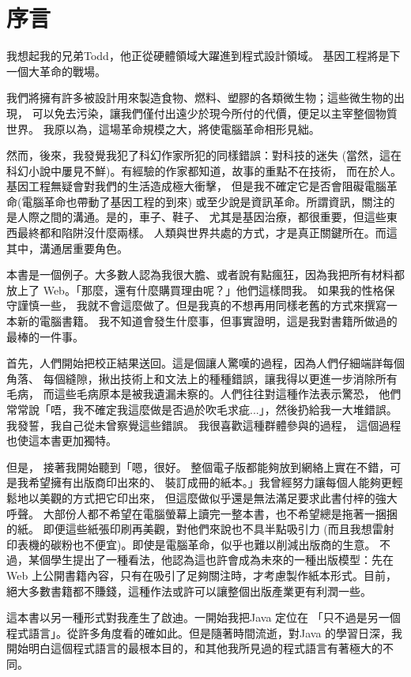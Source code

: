 \chapter[序言]{序言}
我想起我的兄弟Todd，他正從硬體領域大躍進到程式設計領域。
基因工程將是下一個大革命的戰場。

我們將擁有許多被設計用來製造食物、燃料、塑膠的各類微生物；這些微生物的出現，
可以免去污染，讓我們僅付出遠少於現今所付的代價，便足以主宰整個物質世界。
我原以為，這場革命規模之大，將使電腦革命相形見絀。

然而，後來，我發覺我犯了科幻作家所犯的同樣錯誤：對科技的迷失
(當然，這在科幻小說中屢見不鮮)。有經驗的作家都知道，故事的重點不在技術，
而在於人。基因工程無疑會對我們的生活造成極大衝擊，
但是我不確定它是否會阻礙電腦革命(電腦革命也帶動了基因工程的到來)
或至少說是資訊革命。所謂資訊，關注的是人際之間的溝通。是的，車子、鞋子、
尤其是基因治療，都很重要，但這些東西最終都和陷阱沒什麼兩樣。
人類與世界共處的方式，才是真正關鍵所在。而這其中，溝通居重要角色。

本書是一個例子。大多數人認為我很大膽、或者說有點瘋狂，因為我把所有材料都放上了
Web。「那麼，還有什麼購買理由呢？」他們這樣問我。 如果我的性格保守謹慎一些，
我就不會這麼做了。但是我真的不想再用同樣老舊的方式來撰寫一本新的電腦書籍。
我不知道會發生什麼事，但事實證明，這是我對書籍所做過的最棒的一件事。

首先，人們開始把校正結果送回。這是個讓人驚嘆的過程，因為人們仔細端詳每個角落、
每個縫隙，揪出技術上和文法上的種種錯誤，讓我得以更進一步消除所有毛病，
而這些毛病原本是被我遺漏未察的。人們往往對這種作法表示驚恐，
他們常常說「唔，我不確定我這麼做是否過於吹毛求疵...」，然後扔給我一大堆錯誤。
我發誓，我自己從未曾察覺這些錯誤。 我很喜歡這種群體參與的過程，
這個過程也使這本書更加獨特。

但是， 接著我開始聽到「嗯，很好。
整個電子版都能夠放到網絡上實在不錯，可是我希望擁有出版商印出來的、
裝訂成冊的紙本。」我曾經努力讓每個人能夠更輕鬆地以美觀的方式把它印出來，
但這麼做似乎還是無法滿足要求此書付梓的強大呼聲。
大部份人都不希望在電腦螢幕上讀完一整本書，也不希望總是拖著一捆捆的紙。
即便這些紙張印刷再美觀，對他們來說也不具半點吸引力
(而且我想雷射印表機的碳粉也不便宜)。即使是電腦革命，似乎也難以削減出版商的生意。
不過，某個學生提出了一種看法，他認為這也許會成為未來的一種出版模型：先在
Web 上公開書籍內容，只有在吸引了足夠關注時，才考慮製作紙本形式。目前，
絕大多數書籍都不賺錢，這種作法或許可以讓整個出版產業更有利潤一些。

這本書以另一種形式對我產生了啟迪。一開始我把Java 定位在
「只不過是另一個程式語言」。從許多角度看的確如此。但是隨著時間流逝，對Java
的學習日深，我開始明白這個程式語言的最根本目的，和其他我所見過的程式語言有著極大的不同。

